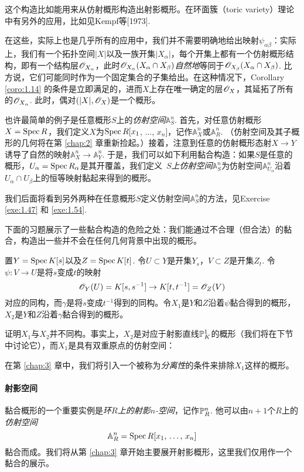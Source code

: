 这个构造比如能用来从仿射概形构造出射影概形。在环面簇（toric variety）理论中有另外的应用，比如见Kempf等[1973].

在这些，实际上也是几乎所有的应用中，我们并不需要明确地给出映射$\psi_{\alpha\beta}$：实际上，我们有一个拓扑空间$|X|$以及一族开集$|X_\alpha|$，每个开集上都有一个仿射概形结构，即有一个结构层$\oo_{X_\alpha}$，此时$\oo_{X_\alpha}(X_\alpha\cap X_\beta)$\textit{自然地}等同于$\oo_{X_\beta}(X_\alpha\cap X_\beta)$. 比方说，它们可能同时作为一个固定集合的子集给出。在这种情况下，Corollary \ref{coro:1.14} 的条件是立即满足的，进而$X$上存在唯一确定的层$\oo_X$，其延拓了所有的$\oo_{X_\alpha}$. 此时，偶对$(|X|,\oo_X)$是一个概形。

也许最简单的例子是任意概形$S$上的\textit{仿射空间}$\mathbb{A}^n_S$. 首先，对任意仿射概形$X=\spec R$，我们定义$X$为$\spec R[x_1$, $\dots$, $x_n]$，记作$\mathbb{A}_X^n$或$\mathbb{A}_R^n$. （仿射空间及其子概形的几何将在第 \ref{chap:2} 章重新捡起。）接着，注意到任意的仿射概形态射$X\to Y$诱导了自然的映射$\mathbb{A}_X^n\to \mathbb{A}_Y^n$. 于是，我们可以如下利用黏合构造：如果$S$是任意的概形，$U_\alpha=\spec R_\alpha$是其开覆盖，我们定义~\textit{$S$上仿射空间$\mathbb{A}_S^n$}为仿射空间$\mathbb{A}_{U_\alpha}^n$沿着$U_\alpha\cap U_\beta$上的恒等映射黏起来得到的概形。

我们后面将看到另外两种在任意概形$S$定义仿射空间$\mathbb{A}_S^n$的方法，见Exercise \ref{exe:1.47} 和 \ref{exe:1.54}.

下面的习题展示了一些黏合构造的危险之处：我们能通过不合理（但合法）的黏合，构造出一些并不会在任何几何背景中出现的概形。

\begin{exe}\label{exe:1.44}
置$Y=\spec K[s]$以及$Z=\spec K[t]$. 令$U\subset Y$是开集$Y_s$，$V\subset Z$是开集$Z_t$. 令$\psi:V\to U$是将$s$变成$t$的映射
\[
	\oo_Y(U)=K[s,s^{-1}]\to K[t,t^{-1}]=\oo_Z(V)
\]
对应的同构，而$\gamma$是将$s$变成$t^{-1}$得到的同构。令$X_1$是$Y$和$Z$沿着$\psi$黏合得到的概形，$X_2$是$Y$和$Z$沿着$\gamma$黏合得到的概形。

证明$X_1$与$X_2$并不同构。事实上，$X_2$是对应于射影直线$\P_K^1$的概形（我们将在下节中讨论它），而$X_1$是具有双重原点的仿射空间：


在第 \ref{chap:3} 章中，我们将引入一个被称为\textit{分离性}的条件来排除$X_1$这样的概形。
\end{exe}

\paragraph*{射影空间}
黏合概形的一个重要实例是\textit{环$R$上的射影$n$-空间}，记作$\P^n_R$. 他可以由$n+1$个$R$上的\textit{仿射空间}
\[
	\A_R^n=\spec R[\text{$x_1$, $\dots$, $x_n$}]
\]
黏合而成。我们将从第 \ref{chap:3} 章开始主要展开射影概形，这里我们仅用作一个黏合的展示。

